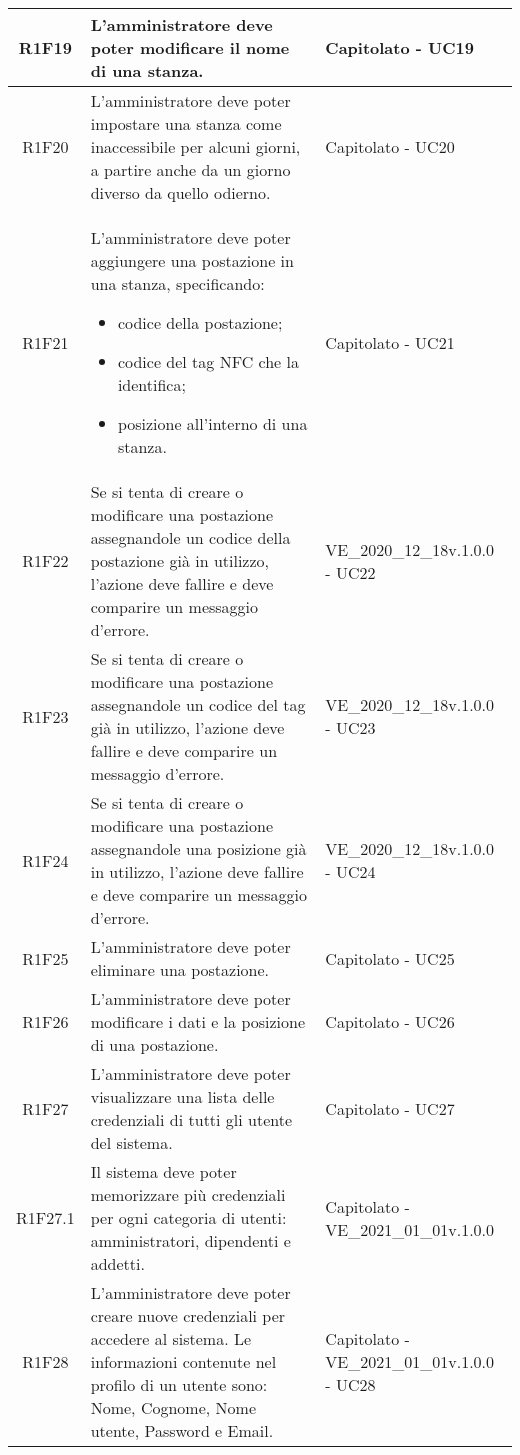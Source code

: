 \begin{center}
\begin{longtable}{|c|p{10cm}|p{4cm}|}
		\hline
		R1F19&L'amministratore deve poter modificare il nome di una stanza.	& Capitolato - UC19	\\
		\hline
		R1F20&L'amministratore deve poter impostare una stanza come inaccessibile per alcuni giorni, a partire anche da un giorno diverso da quello odierno.	& Capitolato - UC20	\\
		\hline
		R1F21&L'amministratore deve poter aggiungere una postazione in una stanza, specificando:
		\begin{itemize}
			\item codice della postazione;
			\item codice del tag NFC che la identifica;
			\item posizione all'interno di una stanza.
		\end{itemize} & Capitolato - UC21	\\
		\hline
		R1F22&	Se si tenta di creare o modificare una postazione assegnandole un codice della postazione già in utilizzo, l'azione deve fallire e deve comparire un messaggio d'errore.& VE\_2020\_12\_18v.1.0.0 - UC22 	\\
		\hline
		R1F23&Se si tenta di creare o modificare una postazione assegnandole un codice del tag già in utilizzo, l'azione deve fallire e deve comparire un messaggio d'errore.	&VE\_2020\_12\_18v.1.0.0 - UC23 	\\
		\hline
		R1F24&Se si tenta di creare o modificare una postazione assegnandole una posizione già in utilizzo, l'azione deve fallire e deve comparire un messaggio d'errore.	&VE\_2020\_12\_18v.1.0.0 - UC24 	\\
		\hline
		R1F25&L'amministratore deve poter eliminare una postazione.	& Capitolato - UC25	\\
		\hline
		R1F26&L'amministratore deve poter modificare i dati e la posizione di una postazione.	& Capitolato - UC26	\\
		\hline
		R1F27&L'amministratore deve poter visualizzare una lista delle credenziali di tutti gli utente del sistema.	& Capitolato - UC27	\\
		\hline
		R1F27.1&Il sistema deve poter memorizzare più credenziali per ogni categoria di utenti: amministratori, dipendenti e addetti.	& Capitolato - VE\_2021\_01\_01v.1.0.0	\\
		\hline
		R1F28&L'amministratore deve poter creare nuove credenziali per accedere al sistema. Le informazioni contenute nel profilo di un utente sono: Nome, Cognome, Nome utente, Password e Email.	& Capitolato - VE\_2021\_01\_01v.1.0.0 - UC28	\\

\end{longtable}
\end{center}
